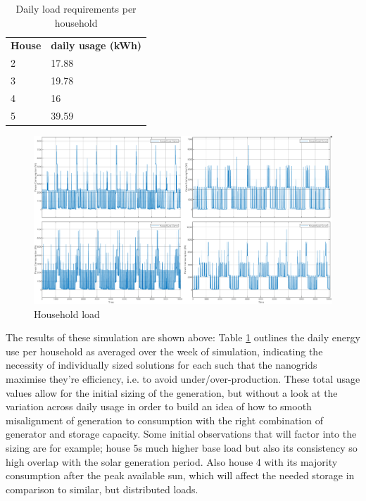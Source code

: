 \documentclass[journal]{IEEEtran}
\begin{document}
\begin{table}[h!]
        \begin{center}
        \begin{tabular}{ll}
                \textbf{House} & \textbf{daily usage (kWh)}   \\
                \rowcolor[HTML]{C6EFCE} 
                2 & 17.88 \\
                \rowcolor[HTML]{FFEB9C} 
                3 & 19.78 \\
                \rowcolor[HTML]{FFC7CE} 
                4 & 16    \\
                \rowcolor[HTML]{BDD7EE} 
                5  & 39.59                       
        \end{tabular}
        \end{center}
\caption{Daily load requirements per household}
\label{tab:load}
\end{table}

\begin{figure}[h!]
        \centering
        \includegraphics[width=0.75\linewidth]{fig/houseloads.png}
\caption{Household load}
\label{fig:load}
\end{figure}

The results of these simulation are shown above: Table \ref{tab:load} outlines the daily energy use per household as averaged over the week of simulation, indicating the necessity of individually sized solutions for each such that the nanogrids maximise they're efficiency, i.e. to avoid under/over-production.
These total usage values allow for the initial sizing of the generation, but without a look at the variation across daily usage in order to build an idea of how to smooth misalignment of generation to consumption with the right combination of generator and storage capacity. 
Some initial observations that will factor into the sizing are for example; house 5s much higher base load but also its consistency so high overlap with the solar generation period. Also house 4 with its majority consumption after the peak available sun, which will affect the needed storage in comparison to similar, but distributed loads.
\end{document}
